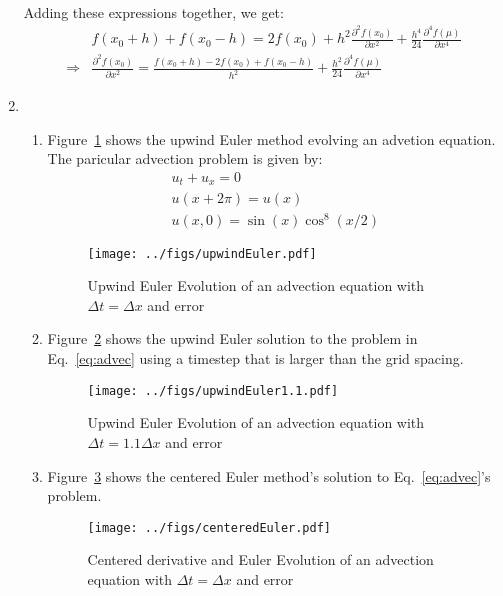 \documentclass[12pt,a4]{article}
\begin{document}
\begin{enumerate}
\begin{align*}
    \end{align*}
    Adding these expressions together, we get:
    \begin{align*}
                  & f(x_0 + h) + f(x_0 - h) =  2 f(x_0) + h^2 \frac{\partial^2 f(x_0)}{\partial x^2} + \frac{h^4}{24} \frac{\partial^4 f(\mu)}{\partial x^4}\\
      \Rightarrow & \frac{\partial^2 f(x_0)}{\partial x^2} =\frac{f(x_0 + h) - 2 f(x_0) + f(x_0 - h)}{h^2}  + \frac{h^2}{24} \frac{\partial^4 f(\mu)}{\partial x^4}
    \end{align*}
  \item
    \begin{enumerate}
      \item
        Figure~\ref{fig:upwindEuler} shows the upwind Euler method evolving an advetion equation.
        The paricular advection problem is given by:
        \begin{equation}
          \begin{gathered}
            u_t + u _x = 0\\
            u(x + 2 \pi) = u(x)\\
            u(x, 0) = \sin(x) \cos^8(x / 2)
          \label{eq:advec}
          \end{gathered}
        \end{equation}
        \begin{figure}[H]
          \centering
          \texttt{[image: ../figs/upwindEuler.pdf]} 
          \caption{Upwind Euler Evolution of an advection equation with $\Delta t = \Delta x$ and error}
          \label{fig:upwindEuler}
        \end{figure}

      \item 
        Figure~\ref{fig:upwindEuler1.1.pdf} shows the upwind Euler solution to the problem in Eq.~\ref{eq:advec} using a timestep that is larger than the grid spacing.
        \begin{figure}[H]
          \centering
          \texttt{[image: ../figs/upwindEuler1.1.pdf]}
          \caption{Upwind Euler Evolution of an advection equation with $\Delta t = 1.1\Delta x$ and error}
          \label{fig:upwindEuler1.1.pdf}
        \end{figure}

      \item
        Figure~\ref{fig:centeredEuler} shows the centered Euler method's solution to Eq.~\ref{eq:advec}'s problem.
        \begin{figure}[H]
          \centering
          \texttt{[image: ../figs/centeredEuler.pdf]}
          \caption{Centered derivative and Euler Evolution of an advection equation  with $\Delta t = \Delta x$ and error}
          \label{fig:centeredEuler}
        \end{figure}
    \end{enumerate}


\end{enumerate}
\end{document}

